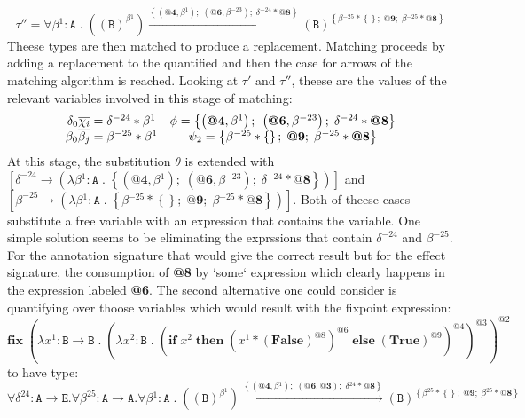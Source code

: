 \documentclass[8pt]{extarticle}
\begin{document}
\[
\tau'' = \forall{}\beta{}^{1}:\mathtt{A}\;{}.\;{}\left(\left(\mathtt{B}\right)^{\beta{}^{1}}\right)\xrightarrow{\left\{\left(\textbf{@4},\beta{}^{1}\right);\;{}\left(\textbf{@6},\beta{}^{-23}\right);\;{}\delta{}^{-24}*\textbf{@8}\right\}}\left(\mathtt{B}\right)^{\left\{\beta{}^{-25}*\left\{\right\};\;{}\textbf{@9};\;{}\beta{}^{-25}*\textbf{@8}\right\}}
\]
Theese types are then matched to produce a replacement. Matching proceeds by adding a replacement to the quantified and then the case for arrows of the matching algorithm is reached. Looking at $\tau'$ and $\tau''$, theese are the values of the relevant variables involved in this stage of matching:
\[
\begin{array}{c c}
\delta_0\overline{\chi_i}=\delta{}^{-24}*\beta{}^{1} & \phi = \left\{\left(\textbf{@4},\beta{}^{1}\right);\;{}\left(\textbf{@6},\beta{}^{-23}\right);\;{}\delta{}^{-24}*\textbf{@8}\right\} \\
\beta_0\overline{\beta_j}=\beta{}^{-25}*\beta{}^{1} & \psi_2=\left\{\beta{}^{-25}*\left\{\right\};\;{}\textbf{@9};\;{}\beta{}^{-25}*\textbf{@8}\right\}
\end{array}
\]
At this stage, the substitution $\theta$ is extended with $\left[\delta^{-24}\to{}\left(\lambda{}\beta{}^{1}:\mathtt{A}\;{}.\;{}\left\{\left(\textbf{@4},\beta{}^{1}\right);\;{}\left(\textbf{@6},\beta{}^{-23}\right);\;{}\delta{}^{-24}*\textbf{@8}\right\}\right)\right]$ and\\ $\left[\beta^{-25}\to{}\left(\lambda{}\beta{}^{1}:\mathtt{A}\;{}.\;{}\left\{\beta{}^{-25}*\left\{\right\};\;{}\textbf{@9};\;{}\beta{}^{-25}*\textbf{@8}\right\}\right)\right]$. Both of theese cases substitute a free variable with an expression that contains the variable. One simple solution seems to be eliminating the exprssions that contain $\delta^{-24}$ and $\beta^{-25}$. For the annotation signature that would give the correct result but for the effect signature, the consumption of {\bf @8} by `some` expression which clearly happens in the expression labeled {\bf @6}. The second alternative one could consider is quantifying over thoose variables which would result with the fixpoint expression:
\[
\mathbf{fix}\;{}\left(\lambda{}x^{1}:\mathtt{B}\to{}\mathtt{B}\;{}.\;{}\left(\lambda{}x^{2}:\mathtt{B}\;{}.\;{}\left(\mathbf{if}\;{}x^{2}\;{}\mathbf{then}\;{}\left(x^{1}*\left(\mathbf{False}\right)^{\mathit{@8}}\right)^{\mathit{@6}}\;{}\mathbf{else}\;{}\left(\mathbf{True}\right)^{\mathit{@9}}\right)^{\mathit{@4}}\right)^{\mathit{@3}}\right)^{\mathit{@2}}
\]
to have type:
\[
\forall{}\delta^{24}:\mathtt{A}\to\mathtt{E}.\forall{}\beta^{25}:\mathtt{A}\to\mathtt{A}.\forall{}\beta{}^{1}:\mathtt{A}\;{}.\;{}\left(\left(\mathtt{B}\right)^{\beta{}^{1}}\right)\xrightarrow{\left\{\left(\textbf{@4},\beta{}^{1}\right);\;{}\left(\textbf{@6},\textbf{@3}\right);\;{}\delta{}^{24}*\textbf{@8}\right\}}\left(\mathtt{B}\right)^{\left\{\beta{}^{25}*\left\{\right\};\;{}\textbf{@9};\;{}\beta{}^{25}*\textbf{@8}\right\}}
\]
\end{document}
